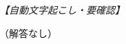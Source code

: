 \documentclass[../../../../main.tex]{subfiles}
\begin{document}
\begin{flushright}
\footnotesize\textit{【自動文字起こし・要確認】}
\end{flushright}

（解答なし）
\end{document}
